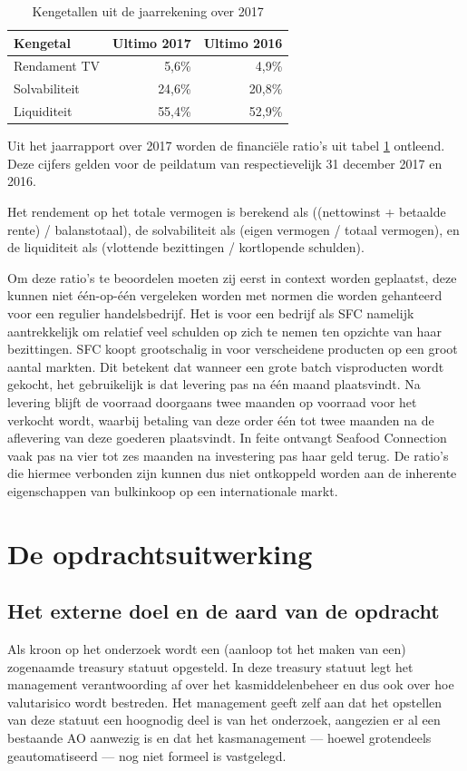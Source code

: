 \documentclass[10pt,a4paper,twoside]{report}
\begin{document}
\begin{table}[h]
    \centering
    \caption{Kengetallen uit de jaarrekening over 2017}
    \begin{tabular}{l r r}
        \toprule
        \textbf{Kengetal} & \textbf{Ultimo 2017} & \textbf{Ultimo 2016} \\
        \midrule
        Rendament TV & 5,6\% & 4,9\% \\
        Solvabiliteit & 24,6\% & 20,8\% \\
        Liquiditeit & 55,4\% & 52,9\% \\
        \bottomrule
    \end{tabular}
    \label{tab:kengetallen}
\end{table}

Uit het jaarrapport over 2017 worden de financiële ratio’s uit tabel \ref{tab:kengetallen} ontleend. Deze cijfers gelden voor de peildatum van respectievelijk 31 december 2017 en 2016.

Het rendement op het totale vermogen is berekend als ((nettowinst + betaalde rente) / balanstotaal), de solvabiliteit als (eigen vermogen / totaal vermogen), en de liquiditeit als (vlottende bezittingen / kortlopende schulden). \citep{jaarrapport2017}

Om deze ratio’s te beoordelen moeten zij eerst in context worden geplaatst, deze kunnen niet één-op-één vergeleken worden met normen die worden gehanteerd voor een regulier handelsbedrijf. Het is voor een bedrijf als SFC namelijk aantrekkelijk om relatief veel schulden op zich te nemen ten opzichte van haar bezittingen. SFC koopt grootschalig in voor verscheidene producten op een groot aantal markten. Dit betekent dat wanneer een grote batch visproducten wordt gekocht, het gebruikelijk is dat levering pas na één maand plaatsvindt. Na levering blijft de voorraad doorgaans twee maanden op voorraad voor het verkocht wordt, waarbij betaling van deze order één tot twee maanden na de aflevering van deze goederen plaatsvindt. In feite ontvangt Seafood Connection vaak pas na vier tot zes maanden na investering pas haar geld terug. De ratio’s die hiermee verbonden zijn kunnen dus niet ontkoppeld worden aan de inherente eigenschappen van bulkinkoop op een internationale markt. \citep{jaarrapport2017}

\chapter{De opdrachtsuitwerking}
\section{Het externe doel en de aard van de opdracht}
Als kroon op het onderzoek wordt een (aanloop tot het maken van een) zogenaamde treasury statuut opgesteld. In deze treasury statuut legt het management verantwoording af over het kasmiddelenbeheer en dus ook over hoe valutarisico wordt bestreden. Het management geeft zelf aan dat het opstellen van deze statuut een hoognodig deel is van het onderzoek, aangezien er al een bestaande AO aanwezig is en dat het kasmanagement --- hoewel grotendeels geautomatiseerd --- nog niet formeel is vastgelegd.
\end{document}
